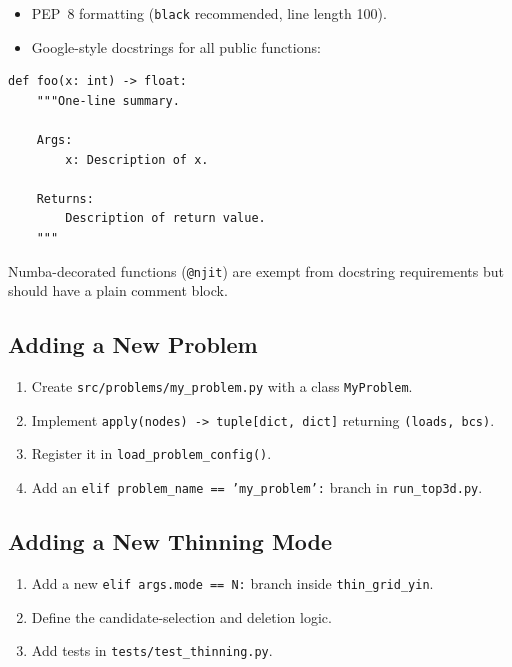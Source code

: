 \documentclass[a4paper, 11pt, openany]{report}
\begin{document}
\begin{itemize}[nosep]
    \item PEP~8 formatting (\texttt{black} recommended, line length 100).
    \item Google-style docstrings for all public functions:
\end{itemize}

\begin{lstlisting}[style=pythonstyle]
def foo(x: int) -> float:
    """One-line summary.

    Args:
        x: Description of x.

    Returns:
        Description of return value.
    """
\end{lstlisting}

Numba-decorated functions (\texttt{@njit}) are exempt from docstring
requirements but should have a plain comment block.

\subsection{Adding a New Problem}

\begin{enumerate}[nosep]
    \item Create \texttt{src/problems/my\_problem.py} with a class
          \texttt{MyProblem}.
    \item Implement \texttt{apply(nodes) -> tuple[dict, dict]} returning
          \texttt{(loads, bcs)}.
    \item Register it in \texttt{load\_problem\_config()}.
    \item Add an \texttt{elif problem\_name == 'my\_problem':} branch in
          \texttt{run\_top3d.py}.
\end{enumerate}

\subsection{Adding a New Thinning Mode}

\begin{enumerate}[nosep]
    \item Add a new \texttt{elif args.mode == N:} branch inside
          \texttt{thin\_grid\_yin}.
    \item Define the candidate-selection and deletion logic.
    \item Add tests in \texttt{tests/test\_thinning.py}.
\end{enumerate}
\end{document}
